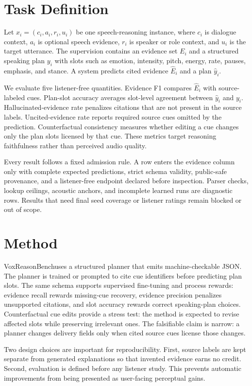 \documentclass{article}
\newcommand{\method}{VoxReasonBench}
\begin{document}
\section{Task Definition}
Let $x_i=(c_i, a_i, r_i, u_i)$ be one speech-reasoning instance, where $c_i$ is dialogue context, $a_i$ is optional speech evidence, $r_i$ is speaker or role context, and $u_i$ is the target utterance. The supervision contains an evidence set $E_i$ and a structured speaking plan $y_i$ with slots such as emotion, intensity, pitch, energy, rate, pauses, emphasis, and stance. A system predicts cited evidence $\hat{E}_i$ and a plan $\hat{y}_i$.

We evaluate five listener-free quantities. Evidence F1 compares $\hat{E}_i$ with source-labeled cues. Plan-slot accuracy averages slot-level agreement between $\hat{y}_i$ and $y_i$. Hallucinated-evidence rate penalizes citations that are not present in the source labels. Uncited-evidence rate reports required source cues omitted by the prediction. Counterfactual consistency measures whether editing a cue changes only the plan slots licensed by that cue. These metrics target reasoning faithfulness rather than perceived audio quality.

Every result follows a fixed admission rule. A row enters the evidence column only with complete expected predictions, strict schema validity, public-safe provenance, and a listener-free endpoint declared before inspection. Parser checks, lookup ceilings, acoustic anchors, and incomplete learned runs are diagnostic rows. Results that need final seed coverage or listener ratings remain blocked or out of scope.

\section{Method}
\method uses a structured planner that emits machine-checkable JSON. The planner is trained or prompted to cite cue identifiers before predicting plan slots. The same schema supports supervised fine-tuning and process rewards: evidence recall rewards missing-cue recovery, evidence precision penalizes unsupported citations, and slot accuracy rewards correct speaking-plan choices. Counterfactual cue edits provide a stress test: the method is expected to revise affected slots while preserving irrelevant ones. The falsifiable claim is narrow: a planner changes delivery fields only when cited source cues license those changes.

Two design choices are important for reproducibility. First, source labels are kept separate from generated explanations so that invented evidence earns no credit. Second, evaluation is defined before any listener study. This prevents automatic improvements from being presented as user-facing perceptual gains.
\end{document}
